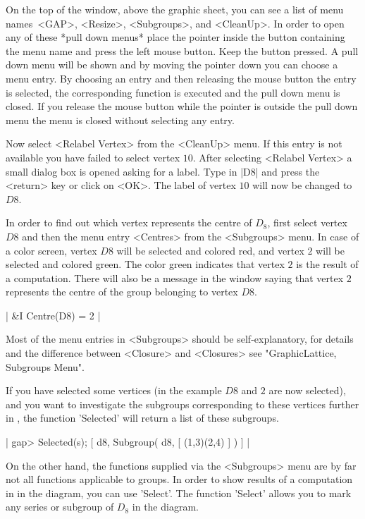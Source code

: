 On the top of the window, above the graphic sheet,  you can see a list of
menu names\:\  <GAP>, <Resize>, <Subgroups>, and  <CleanUp>.  In order to
open any of these *pull  down menus* place the  pointer inside the button
containing   the menu name  and press  the  left  mouse button.  Keep the
button pressed.  A pull down menu will be shown and by moving the pointer
down you  can choose  a   menu entry.  By choosing    an entry and   then
releasing  the  mouse button  the entry   is  selected, the corresponding
function is executed and  the pull down menu is  closed.  If  you release
the mouse button while the pointer is outside the pull down menu the menu
is closed without selecting any entry.

Now select  <Relabel Vertex> from the  <CleanUp> menu.  If this  entry is
not available you have  failed to select   vertex $10$.  After  selecting
<Relabel Vertex> a small  dialog box is opened  asking for a label.  Type
in |D8| and press the <return> key or click on <OK>.  The label of vertex
$10$ will now be changed to $D8$.

In order to find  out which vertex  represents the centre of $D_8$, first
select vertex $D8$ and then the menu entry <Centres> from the <Subgroups>
menu.   In  case of  a  color screen, vertex $D8$   will  be selected and
colored  red, and vertex  $2$ will  be selected  and  colored green.  The
color green  indicates that vertex $2$  is  the result  of a computation.
There will also be a message in the {\GAP} window  saying that vertex $2$
represents the centre of the group belonging to vertex $D8$.

|    &I  Centre(D8) = 2 |

Most of  the menu entries  in <Subgroups> should be self-explanatory, for
details and  the   difference   between  <Closure>  and    <Closures> see
"GraphicLattice, Subgroups Menu".

If you have selected some  vertices (in the example  $D8$ and $2$ are now
selected), and you  want to investigate  the  subgroups corresponding  to
these vertices further in {\GAP},  the function 'Selected' will return  a
list of these subgroups.

|    gap> Selected(s);
    [ d8, Subgroup( d8, [ (1,3)(2,4) ] ) ] |

On the other hand, the functions supplied via the <Subgroups> menu are by
far not all functions applicable to groups.  In  order to show results of
a computation   in {\GAP} in  the diagram,   you  can use  'Select'.  The
function 'Select' allows you to  mark any series or  subgroup of $D_8$ in
the diagram.


